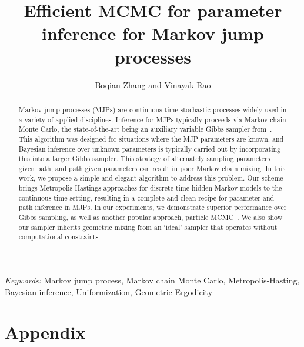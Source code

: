 \documentclass{statsoc}
\title[Efficient MCMC for parameter inference for MJPs]{\bf Efficient MCMC for parameter inference for Markov jump processes}
\author{Boqian Zhang and Vinayak Rao}
\begin{document}
\def\spacingset#1{\renewcommand{\baselinestretch}
{#1}\small\normalsize} \spacingset{1}



\begin{abstract}
Markov jump processes (MJPs) are continuous-time stochastic processes 
widely used in a variety of applied disciplines. Inference for MJPs typically
proceeds via Markov chain Monte Carlo, the state-of-the-art being an auxiliary
variable Gibbs sampler from~\cite{RaoTeh13}. This algorithm was
designed for situations where the MJP parameters are known, and Bayesian
inference over unknown parameters is typically carried out by incorporating
this into a larger Gibbs sampler.
This strategy of alternately sampling parameters given path, and
path given parameters can result in poor Markov chain mixing. In this
work, we propose a simple and elegant algorithm to address this
problem. Our scheme brings Metropolis-Hastings approaches
for discrete-time hidden Markov models to the continuous-time
setting, %
resulting in %
 a complete and clean recipe for
parameter and path inference in MJPs. In our experiments, we
demonstrate superior performance over Gibbs sampling, as well as
another popular approach, particle MCMC~\cite{Andrieu10}.
We also show our sampler inherits geometric mixing from an `ideal' 
sampler that operates without computational constraints.
\end{abstract}
\noindent%
{\it Keywords:}  Markov jump process, Markov chain Monte Carlo, Metropolis-Hasting, Bayesian
inference, Uniformization, Geometric Ergodicity
\vspace{-.05in}






%






\section{Appendix}


%
\end{document}
